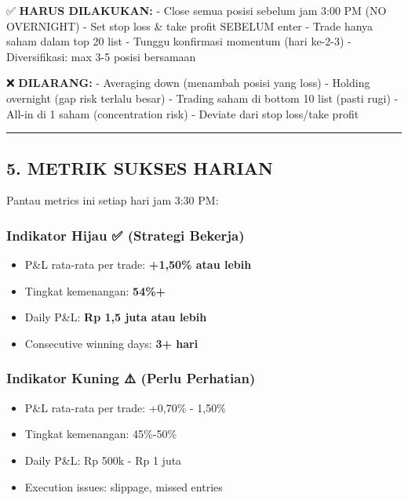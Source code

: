 \documentclass[
  10pt,
  a4paper,
]{article}
\providecommand{\tightlist}{%
  \setlength{\itemsep}{0pt}\setlength{\parskip}{0pt}}\usepackage{longtable,booktabs,array}
\begin{document}
✅ \textbf{HARUS DILAKUKAN:} - Close semua posisi sebelum jam 3:00 PM
(NO OVERNIGHT) - Set stop loss \& take profit SEBELUM enter - Trade
hanya saham dalam top 20 list - Tunggu konfirmasi momentum (hari ke-2-3)
- Diversifikasi: max 3-5 posisi bersamaan

❌ \textbf{DILARANG:} - Averaging down (menambah posisi yang loss) -
Holding overnight (gap risk terlalu besar) - Trading saham di bottom 10
list (pasti rugi) - All-in di 1 saham (concentration risk) - Deviate
dari stop loss/take profit

\begin{center}\rule{0.5\linewidth}{0.5pt}\end{center}

\subsection{5. METRIK SUKSES HARIAN}\label{metrik-sukses-harian}

Pantau metrics ini setiap hari jam 3:30 PM:

\subsubsection{Indikator Hijau ✅ (Strategi
Bekerja)}\label{indikator-hijau-strategi-bekerja}

\begin{itemize}
\tightlist
\item
  P\&L rata-rata per trade: \textbf{+1,50\% atau lebih}
\item
  Tingkat kemenangan: \textbf{54\%+}
\item
  Daily P\&L: \textbf{Rp 1,5 juta atau lebih}
\item
  Consecutive winning days: \textbf{3+ hari}
\end{itemize}

\subsubsection{Indikator Kuning ⚠️ (Perlu
Perhatian)}\label{indikator-kuning-perlu-perhatian}

\begin{itemize}
\tightlist
\item
  P\&L rata-rata per trade: +0,70\% - 1,50\%
\item
  Tingkat kemenangan: 45\%-50\%
\item
  Daily P\&L: Rp 500k - Rp 1 juta
\item
  Execution issues: slippage, missed entries
\end{itemize}
\end{document}
